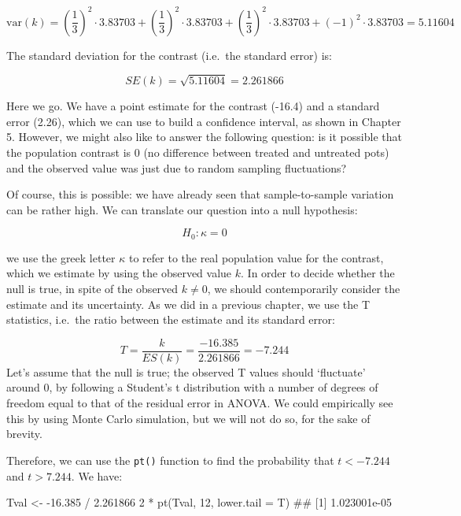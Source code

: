 \documentclass[a4paper,12pt,oneside]{book}
\newenvironment{Shaded}{\begin{snugshade}}{\end{snugshade}}
\newcommand{\DecValTok}[1]{#1}
\newcommand{\FloatTok}[1]{#1}
\newcommand{\SpecialCharTok}[1]{#1}
\newcommand{\DocumentationTok}[1]{#1}
\newcommand{\OtherTok}[1]{#1}
\newcommand{\FunctionTok}[1]{#1}
\newcommand{\AttributeTok}[1]{#1}
\newcommand{\NormalTok}[1]{#1}
\begin{document}
\[\textrm{var}(k) = \left( \frac{1}{3} \right)^2 \cdot 3.83703  +  \left( \frac{1}{3}\right)^2 \cdot 3.83703 + \left( \frac{1}{3}  \right)^2 \cdot 3.83703 + \left( - 1 \right)^2 \cdot 3.83703  = 5.11604\]

The standard deviation for the contrast (i.e.~the standard error) is:

\[SE(k) = \sqrt{5.11604} = 2.261866\]

Here we go. We have a point estimate for the contrast (-16.4) and a standard error (2.26), which we can use to build a confidence interval, as shown in Chapter 5. However, we might also like to answer the following question: is it possible that the population contrast is 0 (no difference between treated and untreated pots) and the observed value was just due to random sampling fluctuations?

Of course, this is possible: we have already seen that sample-to-sample variation can be rather high. We can translate our question into a null hypothesis:

\[H_0: \kappa = 0\]

we use the greek letter \(\kappa\) to refer to the real population value for the contrast, which we estimate by using the observed value \(k\). In order to decide whether the null is true, in spite of the observed \(k \neq 0\), we should contemporarily consider the estimate and its uncertainty. As we did in a previous chapter, we use the T statistics, i.e.~the ratio between the estimate and its standard error:

\[T = \frac{k}{ES(k)} = \frac{-16.385}{2.261866} = -7.244\]
Let's assume that the null is true; the observed T values should `fluctuate' around 0, by following a Student's t distribution with a number of degrees of freedom equal to that of the residual error in ANOVA. We could empirically see this by using Monte Carlo simulation, but we will not do so, for the sake of brevity.

Therefore, we can use the \texttt{pt()} function to find the probability that \(t < -7.244\) and \(t > 7.244\). We have:

\begin{Shaded}
\begin{Highlighting}[]
\NormalTok{Tval }\OtherTok{\textless{}{-}} \SpecialCharTok{{-}}\FloatTok{16.385} \SpecialCharTok{/} \FloatTok{2.261866}
\DecValTok{2} \SpecialCharTok{*} \FunctionTok{pt}\NormalTok{(Tval, }\DecValTok{12}\NormalTok{, }\AttributeTok{lower.tail =}\NormalTok{ T)}
\DocumentationTok{\#\# [1] 1.023001e{-}05}
\end{Highlighting}
\end{Shaded}
\end{document}
